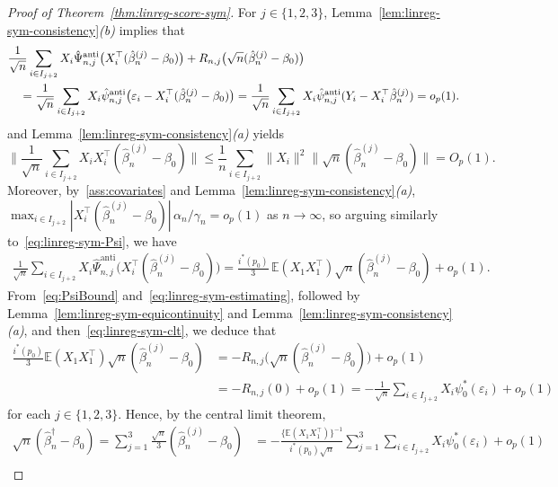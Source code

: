 \documentclass[a4paper]{article}
\newcommand{\E}{\mathbb{E}}
\newcommand{\norm}[1]{\|{#1}\|}
\theoremstyle{definition}
\begin{document}
\begin{proof}[Proof of Theorem~\ref{thm:linreg-score-sym}]
For $j \in \{1,2,3\}$, Lemma~\ref{lem:linreg-sym-consistency}\emph{(b)} implies that
\begin{align}
&\frac{1}{\sqrt{n}}\sum_{i \in I_{j+2}} X_i\hat{\Psi}_{n,j}^{\mathrm{anti}}\bigl(X_i^\top(\hat{\beta}_n^{(j)} - \beta_0)\bigr) + R_{n,j}\bigl(\sqrt{n}(\hat{\beta}_n^{(j)} - \beta_0)\bigr) \notag \\
\label{eq:linreg-sym-estimating}
&\quad= \frac{1}{\sqrt{n}}\sum_{i \in I_{j+2}} X_i\hat{\psi}_{n,j}^{\mathrm{anti}}\bigl(\varepsilon_i - X_i^\top(\hat{\beta}_n^{(j)} - \beta_0)\bigr) = \frac{1}{\sqrt{n}}\sum_{i \in I_{j+2}} X_i\hat{\psi}_{n,j}^{\mathrm{anti}}(Y_i - X_i^\top\hat{\beta}_n^{(j)}) = o_p(1).
\end{align}
and Lemma~\ref{lem:linreg-sym-consistency}\emph{(a)} yields
\[
\biggl\|\frac{1}{\sqrt{n}}\sum_{i \in I_{j+2}} X_i X_i^\top(\hat{\beta}_n^{(j)} - \beta_0)\biggr\|
\leq \frac{1}{n}\sum_{i \in I_{j+2}} \norm{X_i}^2 \norm{\sqrt{n}(\hat{\beta}_n^{(j)} - \beta_0)} = O_p(1).
\]
Moreover, by~\ref{ass:covariates} and Lemma~\ref{lem:linreg-sym-consistency}\textit{(a)}, $\max_{i \in I_{j+2}}|X_i^\top (\hat{\beta}_n^{(j)} - \beta_0)|\,\alpha_n/\gamma_n = o_p(1)$ as $n \to \infty$, so arguing similarly to~\eqref{eq:linreg-sym-Psi}, we have
\begin{align}
\label{eq:PsiBound}
\frac{1}{\sqrt{n}}\sum_{i \in I_{j+2}} X_i\hat{\Psi}_{n,j}^{\mathrm{anti}}\bigl(X_i^\top(\hat{\beta}_n^{(j)} - \beta_0)\bigr)
= \frac{i^*(p_0)}{3}\,\E(X_1 X_1^\top) \sqrt{n}(\hat{\beta}_n^{(j)} - \beta_0) + o_p(1).
\end{align}
From~\eqref{eq:PsiBound} and~\eqref{eq:linreg-sym-estimating}, followed by Lemma~\ref{lem:linreg-sym-equicontinuity} and Lemma~\ref{lem:linreg-sym-consistency}\textit{(a)}, and then~\eqref{eq:linreg-sym-clt}, we deduce that 
\begin{align*}
\frac{i^*(p_0)}{3}\E(X_1 X_1^\top) \sqrt{n}(\hat{\beta}_n^{(j)} - \beta_0) &= - R_{n,j}\bigl(\sqrt{n}(\hat{\beta}_n^{(j)} - \beta_0)\bigr) + o_p(1) \\
&= -R_{n,j}(0) + o_p(1) = -\frac{1}{\sqrt{n}}\sum_{i \in I_{j+2}} X_i\psi_0^*(\varepsilon_i) + o_p(1)
\end{align*}
for each $j \in \{1,2,3\}$.  Hence, by the central limit theorem,
\begin{align*}
\sqrt{n}(\hat{\beta}_n^\dagger - \beta_0) = \sum_{j=1}^3 \frac{\sqrt{n}}{3}(\hat{\beta}_n^{(j)} - \beta_0) &= -\frac{\{\E(X_1 X_1^\top)\}^{-1}}{i^*(p_0)\sqrt{n}}\sum_{j=1}^3 \sum_{i \in I_{j+2}} X_i\psi_0^*(\varepsilon_i) + o_p(1) \\

\end{align*}
\end{proof}
\end{document}
